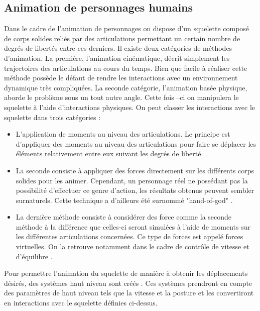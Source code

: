 \documentclass{llncs}
\begin{document}
\subsection{Animation de personnages humains} 
Dans le cadre de l'animation de personnages on dispose d'un squelette composé de corps solides reliés par des articulations permettant un certain nombre de degrés de libertés entre ces derniers. Il existe deux catégories de méthodes d'animation. La première, l'animation cinématique, décrit simplement les trajectoires des articulations au cours du temps. Bien que facile à réaliser cette méthode possède le défaut de rendre les interactions avec un environnement dynamique très compliquées. La seconde catégorie, l'animation basée physique, aborde le problème sous un tout autre angle. Cette fois –ci on manipulera le squelette à l'aide d'interactions physiques. On peut classer les interactions avec le squelette dans trois catégories \cite{geijtenbeek2012interactive}: \newline
\begin{itemize}
\item{L'application de moments au niveau des articulations. Le principe est d'appliquer des moments au niveau des articulations pour faire se déplacer les éléments relativement entre eux suivant les degrés de liberté.}
\item{La seconde consiste à appliquer des forces directement sur les différents corps solides pour les animer. Cependant, un personnage réel ne possédant pas la possibilité d'effectuer ce genre d'action, les résultats obtenus peuvent sembler surnaturels. Cette technique a d'ailleurs été surnommé "hand-of-god" \cite{van1995guided}. }
\item{La dernière méthode consiste à considérer des force comme la seconde méthode à la différence que celles-ci seront simulées à l'aide de moments sur les différentes articulations concernées. Ce type de forces est appelé forces virtuelles. On la retrouve notamment dans le cadre de contrôle de vitesse et d'équilibre \cite{coros2010generalized}.}
\end{itemize}

Pour permettre l'animation du squelette de manière à obtenir les déplacements désirés, des systèmes haut niveau sont créés \cite{geijtenbeek2012interactive}. Ces systèmes prendront en compte des paramètres de haut niveau tels que la vitesse et la posture et les convertiront en interactions avec le squelette définies ci-dessus. 
\end{document}
